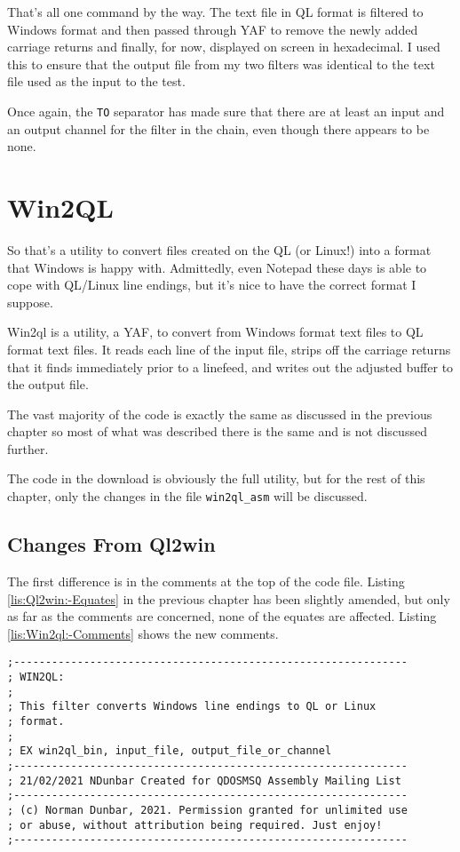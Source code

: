 That's all one command by the way. The text file in QL format is filtered
to Windows format and then passed through YAF to remove the newly
added carriage returns and finally, for now, displayed on screen in
hexadecimal. I used this to ensure that the output file from my two
filters was identical to the text file used as the input to the test. 

Once again, the \lstinline[basicstyle={\ttfamily},showstringspaces=false]!TO!
separator has made sure that there are at least an input and an output
channel for the filter in the chain, even though there appears to
be none.

\chapter{Win2QL}

So that's a utility to convert files created on the QL (or Linux!)
into a format that Windows is happy with. Admittedly, even Notepad
these days is able to cope with QL/Linux line endings, but it's nice
to have the correct format I suppose.

Win2ql is a utility, a YAF, to convert from Windows format text files
to QL format text files. It reads each line of the input file, strips
off the carriage returns that it finds immediately prior to a linefeed,
and writes out the adjusted buffer to the output file.

The vast majority of the code is exactly the same as discussed in
the previous chapter so most of what was described there is the same
and is not discussed further.

The code in the download is obviously the full utility, but for the
rest of this chapter, only the changes in the file \lstinline[basicstyle={\ttfamily},showstringspaces=false]!win2ql_asm!
will be discussed.

\section{Changes From Ql2win}

The first difference is in the comments at the top of the code file.
Listing \ref{lis:Ql2win:-Equates} in the previous chapter has been
slightly amended, but only as far as the comments are concerned, none
of the equates are affected. Listing \ref{lis:Win2ql:-Comments} shows
the new comments.

\begin{lstlisting}[caption={Win2ql: Comments},label={lis:Win2ql:-Comments},firstnumber=1]
;--------------------------------------------------------------
; WIN2QL:
;
; This filter converts Windows line endings to QL or Linux  
; format.
;
; EX win2ql_bin, input_file, output_file_or_channel
;--------------------------------------------------------------
; 21/02/2021 NDunbar Created for QDOSMSQ Assembly Mailing List
;--------------------------------------------------------------
; (c) Norman Dunbar, 2021. Permission granted for unlimited use
; or abuse, without attribution being required. Just enjoy!
;--------------------------------------------------------------

\end{lstlisting}

